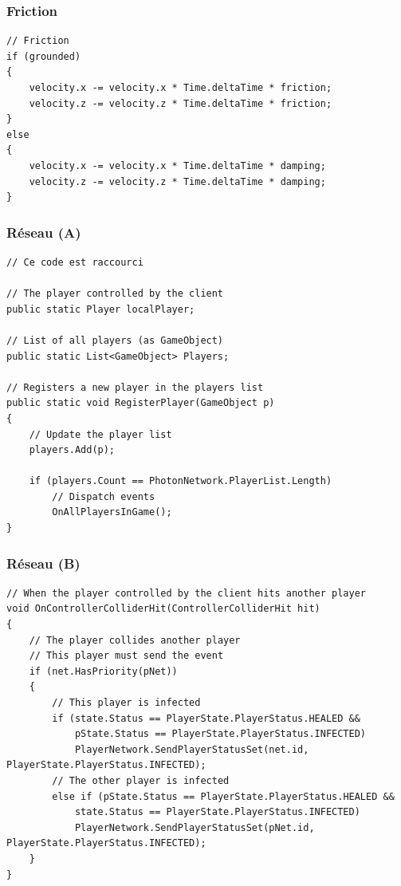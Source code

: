 \documentclass{article}
\begin{document}
\subsubsection{Friction}
\label{Friction}
\begin{lstlisting}
// Friction
if (grounded)
{
    velocity.x -= velocity.x * Time.deltaTime * friction;
    velocity.z -= velocity.z * Time.deltaTime * friction;
}
else
{
    velocity.x -= velocity.x * Time.deltaTime * damping;
    velocity.z -= velocity.z * Time.deltaTime * damping;
}
\end{lstlisting}


\subsubsection{Réseau (A)}
\label{NetA}
\begin{lstlisting}
// Ce code est raccourci

// The player controlled by the client
public static Player localPlayer;

// List of all players (as GameObject)
public static List<GameObject> Players;

// Registers a new player in the players list
public static void RegisterPlayer(GameObject p)
{
    // Update the player list
    players.Add(p);

    if (players.Count == PhotonNetwork.PlayerList.Length)
        // Dispatch events
        OnAllPlayersInGame();
}
\end{lstlisting}


\subsubsection{Réseau (B)}
\label{NetB}
\begin{lstlisting}
// When the player controlled by the client hits another player
void OnControllerColliderHit(ControllerColliderHit hit)
{
    // The player collides another player
    // This player must send the event
    if (net.HasPriority(pNet))
    {
        // This player is infected
        if (state.Status == PlayerState.PlayerStatus.HEALED &&
            pState.Status == PlayerState.PlayerStatus.INFECTED)
            PlayerNetwork.SendPlayerStatusSet(net.id, PlayerState.PlayerStatus.INFECTED);
        // The other player is infected
        else if (pState.Status == PlayerState.PlayerStatus.HEALED &&
            state.Status == PlayerState.PlayerStatus.INFECTED)
            PlayerNetwork.SendPlayerStatusSet(pNet.id, PlayerState.PlayerStatus.INFECTED);
    }
}
\end{lstlisting}
\end{document}
